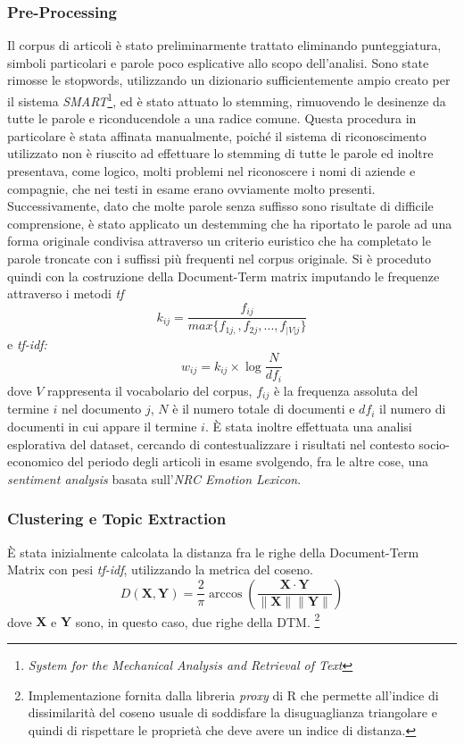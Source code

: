 \documentclass[]{article}
\begin{document}
\subsubsection{Pre-Processing}
Il corpus di articoli è stato preliminarmente trattato eliminando punteggiatura, simboli particolari e parole poco esplicative allo scopo dell'analisi. \newline 
Sono state rimosse le stopwords, utilizzando un dizionario sufficientemente ampio creato per il sistema \textit{SMART}\footnote{\textit{System for the Mechanical Analysis and Retrieval of Text}}, ed è stato attuato lo stemming, rimuovendo le desinenze da tutte le parole e riconducendole a una radice comune. Questa procedura in particolare è stata affinata manualmente, poiché il sistema di riconoscimento utilizzato non è riuscito ad effettuare lo stemming di tutte le parole ed inoltre presentava, come logico, molti problemi nel riconoscere i nomi di aziende e compagnie, che nei testi in esame erano ovviamente molto presenti. \newline
Successivamente, dato che molte parole senza suffisso sono risultate di difficile comprensione, è stato applicato un destemming che ha riportato le parole ad una forma originale condivisa attraverso un criterio euristico che ha completato le parole troncate con i suffissi più frequenti nel corpus originale. \newline
Si è proceduto quindi con la costruzione della Document-Term matrix imputando le frequenze attraverso i metodi \textit{tf} \[ k_{ij}=\frac{f_{ij}}{max\{{f_{1j,},f_{2j},...,f_{|V|j}}\}}\]  e \textit{tf-idf:}\[ w_{ij}={k_{ij}} \times\log{\frac{N}{df_{i}}}\]
dove $V$ rappresenta il vocabolario del corpus, $f_{ij}$ è la frequenza assoluta del termine $i$ nel documento $j$, $N$ è il numero totale di documenti e $df_{i}$ il numero di documenti in cui appare il termine $i$.
\newline
È stata inoltre effettuata una analisi esplorativa del dataset, cercando di contestualizzare i risultati nel contesto socio-economico del periodo degli articoli in esame svolgendo, fra le altre cose, una \textit{sentiment analysis} basata sull'\textit{NRC Emotion Lexicon}.\cite{NRC}
\subsubsection{Clustering e Topic Extraction}
È stata inizialmente calcolata la distanza fra le righe della Document-Term Matrix con pesi \textit{tf-idf}, utilizzando la metrica del coseno.
\[D(\mathbf{X}, \mathbf{Y}) = \frac{2}{\pi}\arccos(\frac{\mathbf{X}\cdot\mathbf{Y}}{\|\mathbf{X}\|\|\mathbf{Y}\|})\]
dove $\mathbf{X}$ e $\mathbf{Y}$ sono, in questo caso, due righe della DTM. \footnote{Implementazione fornita dalla libreria \textit{proxy} di R che permette all'indice di dissimilarità del coseno usuale di soddisfare la disuguaglianza triangolare e quindi di rispettare le proprietà che deve avere un indice di distanza.} \cite{proxy}
\end{document}
